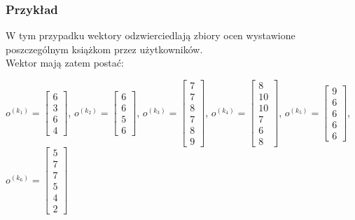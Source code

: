 \documentclass[12pt,a4paper]{report}
\begin{document}
\subsubsection{Przykład}
W tym przypadku wektory odzwierciedlają zbiory ocen wystawione poszczególnym książkom przez użytkowników.
\\Wektor mają zatem postać:
\begin{center}
$o^{(k_1)} = \left[
        \begin{array}{c}
         6 \\
         3 \\
         6 \\
         4 
         \end{array}
      \right]$, $o^{(k_2)} = \left[
        \begin{array}{c}
         6 \\
         6 \\
         5 \\
         6
         \end{array}
      \right]$, $o^{(k_3)} = \left[
        \begin{array}{c}
         7 \\
         7 \\
         8 \\
         7 \\
         8 \\
         9
         \end{array}
      \right]$, $o^{(k_4)} = \left[
        \begin{array}{c}
         8 \\
         10 \\
         10 \\
         7 \\
         6 \\
         8
         \end{array}
      \right]$, $o^{(k_5)} = \left[
        \begin{array}{c}
         9 \\
         6 \\
         6 \\
         6 \\
         6
         \end{array}
      \right]$, $o^{(k_6)} = \left[
        \begin{array}{c}
         5 \\
         7 \\
         7 \\
         5 \\
         4 \\
         2
         \end{array}
      \right]$
\end{center}
\end{document}
